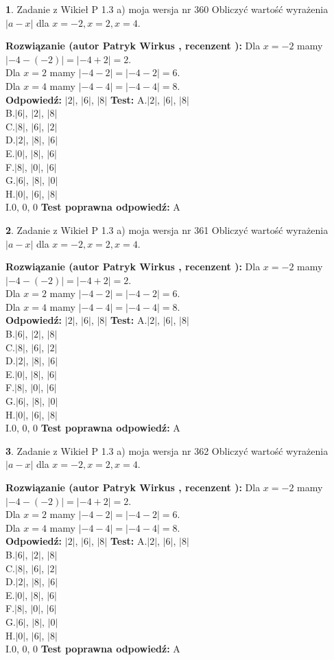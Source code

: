 \documentclass[12pt, a4paper]{article}
\theoremstyle{definition} %
\newtheorem{zad}{}
\newcommand{\zadStart}[1]{\begin{zad}#1\newline}
\newcommand{\zadStop}{\end{zad}}
\newcommand{\rozwStart}[2]{\noindent \textbf{Rozwiązanie (autor #1 , recenzent #2): }\newline}
\newcommand{\rozwStop}{\newline}
\newcommand{\odpStart}{\noindent \textbf{Odpowiedź:}\newline}
\newcommand{\odpStop}{\newline}
\newcommand{\testStart}{\noindent \textbf{Test:}\newline}
\newcommand{\testStop}{\newline}
\newcommand{\kluczStart}{\noindent \textbf{Test poprawna odpowiedź:}\newline}
\newcommand{\kluczStop}{\newline}
\begin{document}
\zadStart{Zadanie z Wikieł P 1.3 a) moja wersja nr 360}
Obliczyć wartość wyrażenia $|a - x|$ dla $x=-2,x=2,x=4$.
\zadStop
\rozwStart{Patryk Wirkus}{}
Dla $x = -2$ mamy $|-4 - (-2)| = |-4 + 2| = 2$.\\
Dla $x = 2$ mamy $|-4 - 2| = |-4 - 2| = 6$.\\
Dla $x = 4$ mamy $|-4 - 4| = |-4 - 4| = 8$.\\
\rozwStop
\odpStart
$|2|$, $|6|$, $|8|$
\odpStop
\testStart
A.$|2|$, $|6|$, $|8|$\\
B.$|6|$, $|2|$, $|8|$\\
C.$|8|$, $|6|$, $|2|$\\
D.$|2|$, $|8|$, $|6|$\\
E.$|0|$, $|8|$, $|6|$\\
F.$|8|$, $|0|$, $|6|$\\
G.$|6|$, $|8|$, $|0|$\\
H.$|0|$, $|6|$, $|8|$\\
I.$0$, $0$, $0$
\testStop
\kluczStart
A
\kluczStop



\zadStart{Zadanie z Wikieł P 1.3 a) moja wersja nr 361}
Obliczyć wartość wyrażenia $|a - x|$ dla $x=-2,x=2,x=4$.
\zadStop
\rozwStart{Patryk Wirkus}{}
Dla $x = -2$ mamy $|-4 - (-2)| = |-4 + 2| = 2$.\\
Dla $x = 2$ mamy $|-4 - 2| = |-4 - 2| = 6$.\\
Dla $x = 4$ mamy $|-4 - 4| = |-4 - 4| = 8$.\\
\rozwStop
\odpStart
$|2|$, $|6|$, $|8|$
\odpStop
\testStart
A.$|2|$, $|6|$, $|8|$\\
B.$|6|$, $|2|$, $|8|$\\
C.$|8|$, $|6|$, $|2|$\\
D.$|2|$, $|8|$, $|6|$\\
E.$|0|$, $|8|$, $|6|$\\
F.$|8|$, $|0|$, $|6|$\\
G.$|6|$, $|8|$, $|0|$\\
H.$|0|$, $|6|$, $|8|$\\
I.$0$, $0$, $0$
\testStop
\kluczStart
A
\kluczStop



\zadStart{Zadanie z Wikieł P 1.3 a) moja wersja nr 362}
Obliczyć wartość wyrażenia $|a - x|$ dla $x=-2,x=2,x=4$.
\zadStop
\rozwStart{Patryk Wirkus}{}
Dla $x = -2$ mamy $|-4 - (-2)| = |-4 + 2| = 2$.\\
Dla $x = 2$ mamy $|-4 - 2| = |-4 - 2| = 6$.\\
Dla $x = 4$ mamy $|-4 - 4| = |-4 - 4| = 8$.\\
\rozwStop
\odpStart
$|2|$, $|6|$, $|8|$
\odpStop
\testStart
A.$|2|$, $|6|$, $|8|$\\
B.$|6|$, $|2|$, $|8|$\\
C.$|8|$, $|6|$, $|2|$\\
D.$|2|$, $|8|$, $|6|$\\
E.$|0|$, $|8|$, $|6|$\\
F.$|8|$, $|0|$, $|6|$\\
G.$|6|$, $|8|$, $|0|$\\
H.$|0|$, $|6|$, $|8|$\\
I.$0$, $0$, $0$
\testStop
\kluczStart
A
\kluczStop
\end{document}
